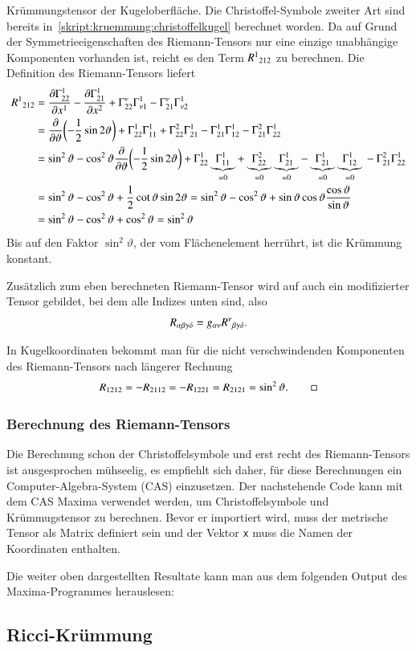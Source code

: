 \begin{beispiel}
Krümmungstensor der Kugeloberfläche.
Die Christoffel-Symbole zweiter Art sind bereits
in~\eqref{skript:kruemmung:christoffelkugel}
berechnet worden.
Da auf Grund der Symmetrieeigenschaften des Riemann-Tensors nur eine
einzige unabhängige Komponenten vorhanden ist, reicht es den
Term $R^1\mathstrut_{212}$ zu berechnen.
Die Definition des Riemann-Tensors liefert
\begin{align*}
R^1\mathstrut_{212}
&=
\frac{\partial \Gamma_{22}^1}{\partial x^1}
-
\frac{\partial \Gamma_{21}^1}{\partial x^2}
+
\Gamma_{22}^\nu
\Gamma_{\nu1}^1
-
\Gamma_{21}^\nu
\Gamma_{\nu2}^1
\\
&=
\frac{\partial}{\partial\vartheta}\biggl(-\frac12\sin2\vartheta\biggr)
+
\Gamma_{22}^1
\Gamma_{11}^1
+
\Gamma_{22}^2
\Gamma_{21}^1
-
\Gamma_{21}^1
\Gamma_{12}^1
-
\Gamma_{21}^2
\Gamma_{22}^1
\\
&=
\sin^2\vartheta - \cos^2\vartheta
\frac{\partial}{\partial\vartheta}\biggl(-\frac12\sin2\vartheta\biggr)
+
\Gamma_{22}^1
\underbrace{\Gamma_{11}^1}_{=0}
+
\underbrace{\Gamma_{22}^2}_{=0}
\underbrace{\Gamma_{21}^1}_{=0}
-
\underbrace{\Gamma_{21}^1}_{=0}
\underbrace{\Gamma_{12}^1}_{=0}
\mathstrut
-
\Gamma_{21}^2
\Gamma_{22}^1
\\
&=
\sin^2\vartheta - \cos^2\vartheta
+
\frac12 \cot \vartheta \sin2\vartheta
=
\sin^2\vartheta - \cos^2\vartheta
+
\sin\vartheta\cos\vartheta\frac{\cos\vartheta}{\sin\vartheta}
\\
&=
\sin^2\vartheta - \cos^2\vartheta
+
\cos^2\vartheta
=
\sin^2\vartheta
\end{align*}
Bis auf den Faktor $\sin^2\vartheta$, der vom Flächenelement herrührt,
ist die Krümmung konstant.
\end{beispiel}

Zusätzlich zum eben berechneten Riemann-Tensor wird auf auch ein
modifizierter Tensor gebildet, bei dem alle Indizes unten sind,
also
\[
R_{\alpha\beta\gamma\delta} = g_{\alpha\nu}R^\nu\mathstrut_{\beta\gamma\delta}.
\]

\begin{beispiel}
In Kugelkoordinaten bekommt man für die nicht verschwindenden Komponenten
des Riemann-Tensors nach längerer Rechnung
\[
R_{1212}
=
-R_{2112}
=
-R_{1221}
=
R_{2121}
=
\sin^2\vartheta.
\qedhere
\]
\end{beispiel}

\subsubsection{Berechnung des Riemann-Tensors}
Die Berechnung schon der Christoffelsymbole und erst recht des
Riemann-Tensors ist ausgesprochen mühseelig, es empfiehlt sich
daher, für diese Berechnungen ein Computer-Algebra-System (CAS) einzusetzen.
Der nachstehende Code kann mit dem CAS Maxima verwendet werden, um
Christoffelsymbole und Krümmugstensor zu berechnen.
Bevor er importiert wird, muss der metrische Tensor als Matrix
definiert sein und der Vektor {\tt x} muss die Namen der Koordinaten
enthalten.



Die weiter oben dargestellten Resultate kann man aus dem folgenden Output
des Maxima-Programmes herauslesen:
{\small

}

\subsection{Ricci-Krümmung}

